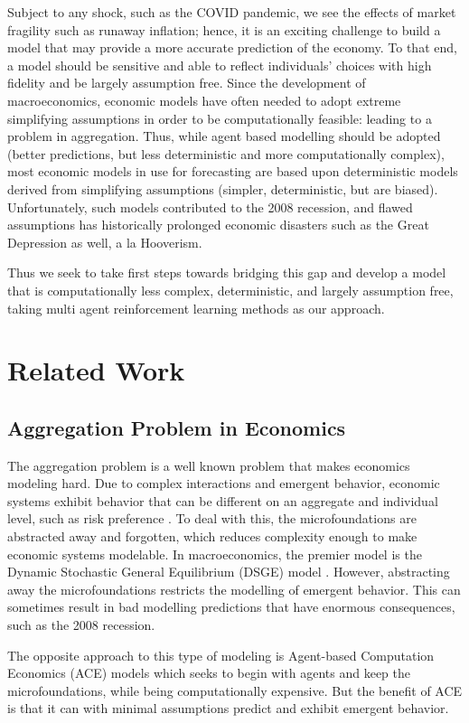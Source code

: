 \documentclass{article}
\begin{document}
Subject to any shock, such as the COVID pandemic, we see the effects of market fragility such as runaway inflation; hence, it is an exciting challenge to build a model that may provide a more accurate prediction of the economy. To that end, a model should be sensitive and able to reflect individuals' choices with high fidelity and be largely assumption free. Since the development of macroeconomics, economic models have often needed to adopt extreme simplifying assumptions in order to be computationally feasible: leading to a problem in aggregation. Thus, while agent based modelling should be adopted (better predictions, but less deterministic and more computationally complex), most economic models in use for forecasting are based upon deterministic models derived from simplifying assumptions (simpler, deterministic, but are biased). Unfortunately, such models contributed to the 2008 recession, and flawed assumptions has historically prolonged economic disasters such as the Great Depression as well, a la Hooverism. 

Thus we seek to take first steps towards bridging this gap and develop a model that is computationally less complex, deterministic, and largely assumption free, taking multi agent reinforcement learning methods as our approach.

\section{Related Work}

\subsection{Aggregation Problem in Economics}
The aggregation problem is a well known problem that makes economics modeling hard. Due to complex interactions and emergent behavior, economic systems exhibit behavior that can be different on an aggregate and individual level, such as risk preference \citep{blackburn2008aggregation}. To deal with this, the microfoundations are abstracted away and forgotten, which reduces complexity enough to make economic systems modelable. In macroeconomics, the premier model is the Dynamic Stochastic General Equilibrium (DSGE) model \citep{gali2015monetary}. However, abstracting away the microfoundations restricts the modelling of emergent behavior. This can sometimes result in bad modelling predictions that have enormous consequences, such as the 2008 recession. 

The opposite approach to this type of modeling is Agent-based Computation Economics (ACE) models \citep{niazi2011ace} which seeks to begin with agents and keep the microfoundations, while being computationally expensive. But the benefit of ACE is that it can with minimal assumptions predict and exhibit emergent behavior.
\end{document}
